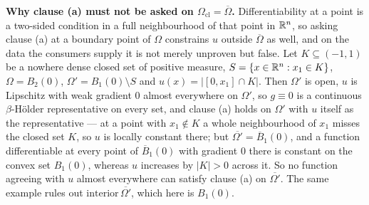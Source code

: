 \begin{definition}
\noindent\textbf{Why clause (a) must not be asked on
$\Omega_{\mathrm{cl}}=\overline{\Omega}$.}  Differentiability at a point is a
two-sided condition in a full neighbourhood of that point in $\mathbb{R}^n$, so asking
clause (a) at a boundary point of $\Omega$ constrains $u$ outside
$\overline{\Omega}$ as well, and on the data the consumers supply it is not
merely unproven but false.  Let $K\subseteq(-1,1)$ be a nowhere dense closed set
of positive measure, $S=\{x\in\mathbb{R}^n:x_1\in K\}$, $\Omega=B_2(0)$,
$\Omega'=B_1(0)\setminus S$ and $u(x)=\bigl|[0,x_1]\cap K\bigr|$.  Then
$\Omega'$ is open, $u$ is Lipschitz with weak gradient $0$ almost everywhere on
$\Omega'$, so $g\equiv0$ is a continuous $\beta$-H\"older representative on
every set, and clause (a) holds on $\Omega'$ with $u$ itself as the
representative --- at a point with $x_1\notin K$ a whole neighbourhood of $x_1$
misses the closed set $K$, so $u$ is locally constant there; but $\overline{\Omega'}=\overline B_1(0)$, and a function
differentiable at every point of $\overline B_1(0)$ with gradient $0$ there is
constant on the convex set $B_1(0)$, whereas $u$ increases by $|K|>0$ across it.
So no function agreeing with $u$ almost everywhere can satisfy clause (a) on
$\overline{\Omega'}$.  The same example rules out
$\mathrm{interior}\,\overline{\Omega'}$, which here is $B_1(0)$.
\end{definition}
